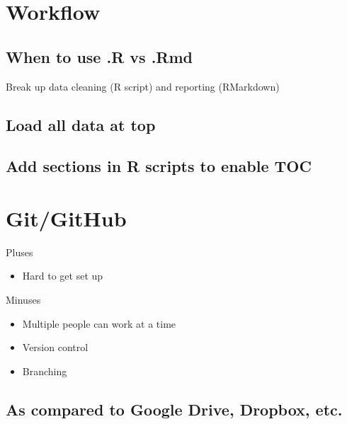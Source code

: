 \documentclass[]{book}
\providecommand{\tightlist}{%
  \setlength{\itemsep}{0pt}\setlength{\parskip}{0pt}}
\begin{document}
\hypertarget{workflow}{%
\section{Workflow}\label{workflow}}

\hypertarget{when-to-use-.r-vs-.rmd}{%
\subsection{When to use .R vs .Rmd}\label{when-to-use-.r-vs-.rmd}}

Break up data cleaning (R script) and reporting (RMarkdown)

\hypertarget{load-all-data-at-top}{%
\subsection{Load all data at top}\label{load-all-data-at-top}}

\hypertarget{add-sections-in-r-scripts-to-enable-toc}{%
\subsection{Add sections in R scripts to enable TOC}\label{add-sections-in-r-scripts-to-enable-toc}}

\hypertarget{gitgithub}{%
\section{Git/GitHub}\label{gitgithub}}

Pluses

\begin{itemize}
\tightlist
\item
  Hard to get set up
\end{itemize}

Minuses

\begin{itemize}
\tightlist
\item
  Multiple people can work at a time
\item
  Version control
\item
  Branching
\end{itemize}

\hypertarget{as-compared-to-google-drive-dropbox-etc.}{%
\subsection{As compared to Google Drive, Dropbox, etc.}\label{as-compared-to-google-drive-dropbox-etc.}}
\end{document}
